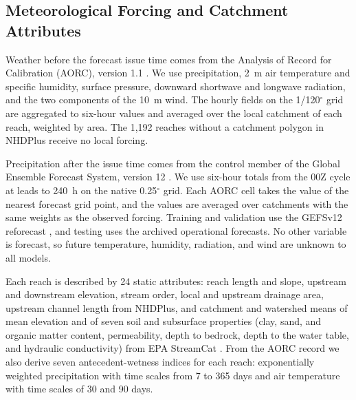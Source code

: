 \subsection{Meteorological Forcing and Catchment Attributes}
\label{sec:inputs}
Weather before the forecast issue time comes from the Analysis of Record for Calibration (AORC), version 1.1 . We use precipitation, 2~m air temperature and specific humidity, surface pressure, downward shortwave and longwave radiation, and the two components of the 10~m wind. The hourly fields on the 1/120$^\circ$ grid are aggregated to six-hour values and averaged over the local catchment of each reach, weighted by area. The 1,192 reaches without a catchment polygon in NHDPlus receive no local forcing.

Precipitation after the issue time comes from the control member of the Global Ensemble Forecast System, version 12 \cite{Zhou2022,Guan2022}. We use six-hour totals from the 00Z cycle at leads to 240~h on the native 0.25$^\circ$ grid. Each AORC cell takes the value of the nearest forecast grid point, and the values are averaged over catchments with the same weights as the observed forcing. Training and validation use the GEFSv12 reforecast \cite{Guan2022}, and testing uses the archived operational forecasts. No other variable is forecast, so future temperature, humidity, radiation, and wind are unknown to all models.

Each reach is described by 24 static attributes: reach length and slope, upstream and downstream elevation, stream order, local and upstream drainage area, upstream channel length from NHDPlus, and catchment and watershed means of mean elevation and of seven soil and subsurface properties (clay, sand, and organic matter content, permeability, depth to bedrock, depth to the water table, and hydraulic conductivity) from EPA StreamCat . From the AORC record we also derive seven antecedent-wetness indices for each reach: exponentially weighted precipitation with time scales from 7 to 365 days and air temperature with time scales of 30 and 90 days.

